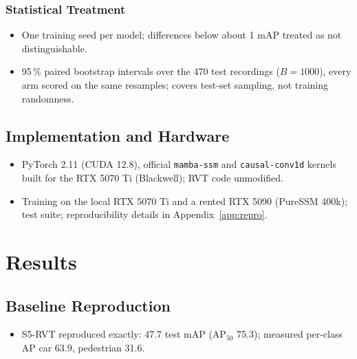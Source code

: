 \documentclass[11pt, a4paper]{report}
\begin{document}
\subsection{Statistical Treatment}
\begin{itemize}
  \item One training seed per model; differences below about 1 mAP treated as not distinguishable.
  \item 95\,\% paired bootstrap intervals over the 470 test recordings ($B = 1000$), every arm scored on the same resamples; covers test-set sampling, not training randomness.
\end{itemize}

\section{Implementation and Hardware}
\begin{itemize}
  \item PyTorch 2.11 (CUDA 12.8), official \texttt{mamba-ssm} and \texttt{causal-conv1d} kernels built for the RTX 5070 Ti (Blackwell); RVT code unmodified.
  \item Training on the local RTX 5070 Ti and a rented RTX 5090 (PureSSM 400k); test suite; reproducibility details in Appendix~\ref{app:repro}.
\end{itemize}

\chapter{Results}
\label{ch:results}
\section{Baseline Reproduction}
\label{sec:repro_results}
\begin{itemize}
  \item S5-RVT reproduced exactly: 47.7 test mAP ($\mathrm{AP}_{50}$ 75.3); measured per-class AP car 63.9, pedestrian 31.6.
\end{itemize}
\end{document}
